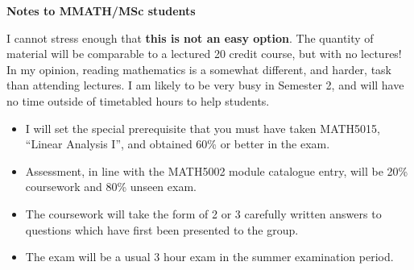 \documentclass[twoside,12pt,a4paper]{article}
\begin{document}
\medskip
\noindent\textbf{Notes to MMATH/MSc students}
\medskip

I cannot stress enough that \textbf{this is not an easy option}.  The quantity
of material will be comparable to a lectured 20 credit course, but with no
lectures!  In my opinion, reading mathematics is a somewhat different, and
harder, task than attending lectures.  I am likely to be very busy in
Semester 2, and will have no time outside of timetabled hours to help students.
\begin{itemize}
\item I will set the special prerequisite that you must have taken
MATH5015, ``Linear Analysis I'', and obtained 60\% or better in the exam.
\item Assessment, in line with the MATH5002 module catalogue entry, will
be 20\% coursework and 80\% unseen exam.
\item The coursework will take the form of 2 or 3 carefully written answers
to questions which have first been presented to the group.
\item The exam will be a usual 3 hour exam in the summer examination
period.
\end{itemize}
\end{document}
